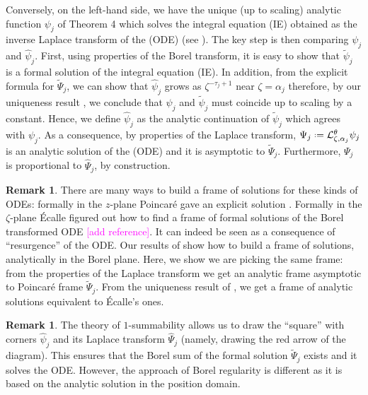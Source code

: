 \documentclass{article}
\theoremstyle{definition}
\newcommand{\series}[1]{\tilde{#1}}
\newcommand*{\defeq}{\mathrel{\vcenter{\baselineskip0.5ex \lineskiplimit0pt
                     \hbox{\scriptsize.}\hbox{\scriptsize.}}}%
                     =}
\newcommand{\laplace}{\mathcal{L}}
\newtheorem{remark}[definition]{Remark}
\begin{document}
Conversely, on the left-hand side, we have the unique (up to scaling) analytic function $\psi_j$ of Theorem 4 \cite{reg-sing-volterra} which solves the integral equation (IE) obtained as the inverse Laplace transform of the (ODE) (see \cite[Lemma 2]{reg-sing-volterra}). The key step is then comparing $\psi_j$ and $\hat{\psi}_j$. First, using properties of the Borel transform, it is easy to show that $\series{\psi}_j$ is a formal solution of the integral equation (IE). In addition, from the explicit formula for $\tilde{\Psi}_j$, we can show that $\hat{\psi}_j$ grows as $\zeta^{-\tau_j+1}$ near $\zeta=\alpha_j$
therefore, by our uniqueness result \cite[Theorem 4]{reg-sing-volterra}, we conclude that $\psi_j$ and $\tilde{\psi}_j$ must coincide up to scaling by a constant. Hence, we define $\hat{\psi}_j$ as the analytic continuation of $\tilde{\psi}_j$ which agrees with $\psi_j$. As a consequence, by properties of the Laplace transform, $\Psi_j\defeq\laplace_{\zeta,\alpha_j}^{\theta}\psi_j$ is an analytic solution of the (ODE) and it is asymptotic to $\series{\Psi}_j$. Furthermore, $\Psi_j$ is proportional to $\hat{\Psi}_j$, by construction.   

\begin{remark}
There are many ways to build a frame of solutions for these kinds of ODEs: formally in the $z$-plane Poincar\'e gave an explicit solution \cite{int-irreg}. Formally in the $\zeta$-plane \'Ecalle figured out how to find a frame of formal solutions of the Borel transformed ODE \textcolor{magenta}{[add reference]\cite{EcalleIII,loday-Remy2011}}. It can indeed be seen as a consequence of ``resurgence'' of the ODE. Our results of \cite{reg-sing-volterra} show how to build a frame of solutions, analytically in the Borel plane. Here, we show we are picking the same frame: from the properties of the Laplace transform we get an analytic frame asymptotic to Poincar\'e frame $\series{\Psi}_j$. From the uniqueness result of \cite[Theorem~4]{reg-sing-volterra}, we get a frame of analytic solutions equivalent to \'Ecalle's ones. 
\end{remark} 

\begin{remark}
The theory of $1$-summability allows us to draw the ``square'' with corners $\hat{\psi}_j$ and its Laplace transform $\hat{\Psi}_j$ (namely, drawing the red arrow of the diagram). This ensures that the Borel sum of the formal solution $\series{\Psi}_j$ exists and it solves the ODE. However, the approach of Borel regularity is different as it is based on the analytic solution in the position domain. 
\end{remark}
\end{document}
